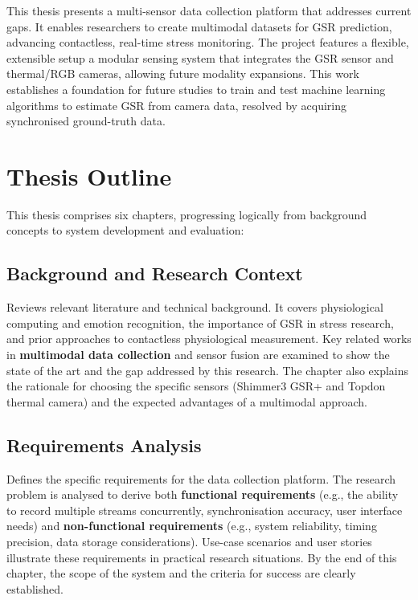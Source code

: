 This thesis presents a multi-sensor data collection platform that addresses current gaps. It enables researchers to create multimodal datasets for GSR prediction, advancing contactless, real-time stress monitoring. The project features a flexible, extensible setup \textemdash a modular sensing system \textemdash that integrates the GSR sensor and thermal/RGB cameras, allowing future modality expansions. This work establishes a foundation for future studies to train and test machine learning algorithms to estimate GSR from camera data, resolved by acquiring synchronised ground-truth data.


\section{Thesis Outline}
This thesis comprises six chapters, progressing logically from background concepts to system development and evaluation:

\subsection{Background and Research Context} Reviews relevant literature and technical background. It covers physiological computing and emotion recognition, the importance of GSR in stress research, and prior approaches to contactless physiological measurement. Key related works in \textbf{multimodal data collection} and sensor fusion are examined to show the state of the art and the gap addressed by this research. The chapter also explains the rationale for choosing the specific sensors (Shimmer3 GSR+ and Topdon thermal camera) and the expected advantages of a multimodal approach.

\subsection{Requirements Analysis} Defines the specific requirements for the data collection platform. The research problem is analysed to derive both \textbf{functional requirements} (e.g., the ability to record multiple streams concurrently, synchronisation accuracy, user interface needs) and \textbf{non-functional requirements} (e.g., system reliability, timing precision, data storage considerations). Use-case scenarios and user stories illustrate these requirements in practical research situations. By the end of this chapter, the scope of the system and the criteria for success are clearly established.

